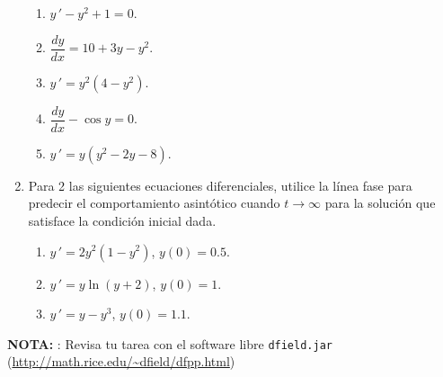 \documentclass[letterpaper,10pt]{memoir}
\begin{document}
\begin{enumerate}
		\begin{enumerate}
			\item \(y \,' -y^2+1=0\).
			\item \(\dfrac{dy}{dx} =10+3y-y^2\).
			\item \(y \,' =y^2(4-y^2)\).
			\item \(\dfrac{dy}{dx} - \cos y=0\).
			\item \(y \,' =y(y^2-2y-8)\).
		\end{enumerate}
	\item Para 2 las siguientes ecuaciones diferenciales, utilice la línea fase para predecir el comportamiento asintótico cuando \(t \longrightarrow \infty\) para la solución que satisface la condición inicial dada.
		\begin{enumerate}
			\item \(y \,' =2y^2(1-y^2)\), \(y(0) =0.5\).
			\item \(y \,' = y \ln (y+2)\), \(y(0) =1\).
			\item \(y \,' =y-y^3\), \(y(0) =1.1\).
		\end{enumerate}
\end{enumerate}
\textbf{NOTA:} : Revisa tu tarea con el software libre \texttt{dfield.jar} (\url{http://math.rice.edu/~dfield/dfpp.html})
\end{document}

